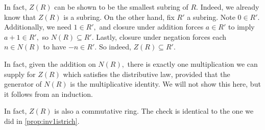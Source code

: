 \documentclass{article}
\begin{document}
\begin{remark}
	In fact, $Z(R)$ can be shown to be the smallest subring of $R.$ Indeed, we already know that $Z(R)$ is a subring. On the other hand, fix $R'$ a subring. Note $0\in R'.$ Additionally, we need $1\in R',$ and closure under addition forces $a\in R'$ to imply $a+1\in R',$ so $N(R)\subseteq R'.$ Lastly, closure under negation forces each $n\in N(R)$ to have $-n\in R'.$ So indeed, $Z(R)\subseteq R'.$
\end{remark}
In fact, given the addition on $N(R),$ there is exactly one multiplication we can supply for $Z(R)$ which satisfies the distributive law, provided that the generator of $N(R)$ is the multiplicative identity. We will not show this here, but it follows from an induction.
\begin{remark}
	In fact, $Z(R)$ is also a commutative ring. The check is identical to the one we did in \autoref{prop:inv1istrich}.
\end{remark}
\end{document}

